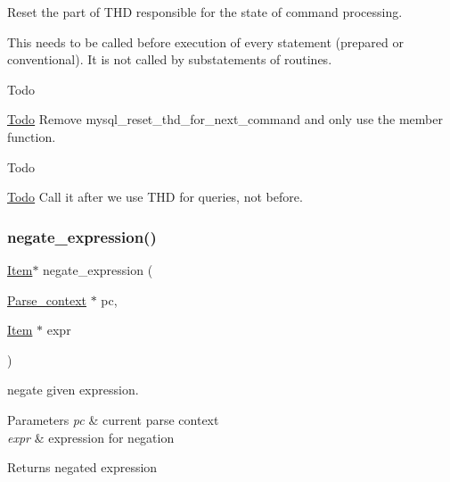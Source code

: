 Reset the part of T\+HD responsible for the state of command processing.

This needs to be called before execution of every statement (prepared or conventional). It is not called by substatements of routines.

\begin{DoxyRefDesc}{Todo}
\item[\mbox{\hyperlink{todo__todo000102}{Todo}}]Remove mysql\+\_\+reset\+\_\+thd\+\_\+for\+\_\+next\+\_\+command and only use the member function.\end{DoxyRefDesc}


\begin{DoxyRefDesc}{Todo}
\item[\mbox{\hyperlink{todo__todo000103}{Todo}}]Call it after we use T\+HD for queries, not before. \end{DoxyRefDesc}
\mbox{\label{group__Runtime__Environment_ga370cd1baacb8f9761d1f6caba0f01954}} 
\subsubsection{\texorpdfstring{negate\+\_\+expression()}{negate\_expression()}}
{\footnotesize\ttfamily \mbox{\hyperlink{classItem}{Item}}$\ast$ negate\+\_\+expression (\begin{DoxyParamCaption}\item[{\mbox{\hyperlink{structParse__context}{Parse\+\_\+context}} $\ast$}]{pc,  }\item[{\mbox{\hyperlink{classItem}{Item}} $\ast$}]{expr }\end{DoxyParamCaption})}

negate given expression.


\begin{DoxyParams}{Parameters}
{\em pc} & current parse context \\
\hline
{\em expr} & expression for negation\\
\hline
\end{DoxyParams}
\begin{DoxyReturn}{Returns}
negated expression 
\end{DoxyReturn}
\mbox{\label{group__Runtime__Environment_gabb1400ab6d81b2c3eb496d66df4d7674}} 

